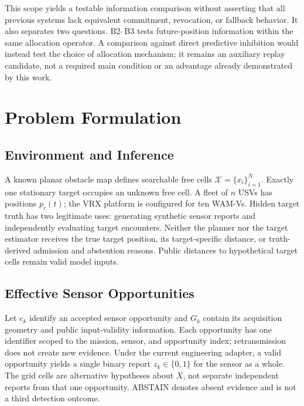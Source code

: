 \documentclass[conference]{IEEEtran}
\begin{document}
This scope yields a testable information comparison without asserting that all previous systems lack equivalent commitment, revocation, or fallback behavior. It also separates two questions. B2--B3 tests future-position information within the same allocation operator. A comparison against direct predictive inhibition would instead test the choice of allocation mechanism; it remains an auxiliary replay candidate, not a required main condition or an advantage already demonstrated by this work.

\section{Problem Formulation}
\subsection{Environment and Inference}
A known planar obstacle map defines searchable free cells $\mathcal X=\{x_i\}_{i=1}^N$. Exactly one stationary target occupies an unknown free cell. A fleet of $n$ USVs has positions $p_r(t)$; the VRX platform is configured for ten WAM-Vs. Hidden target truth has two legitimate uses: generating synthetic sensor reports and independently evaluating target encounters. Neither the planner nor the target estimator receives the true target position, its target-specific distance, or truth-derived admission and abstention reasons. Public distances to hypothetical target cells remain valid model inputs.

\subsection{Effective Sensor Opportunities}
Let $e_k$ identify an accepted sensor opportunity and $G_k$ contain its acquisition geometry and public input-validity information. Each opportunity has one identifier scoped to the mission, sensor, and opportunity index; retransmission does not create new evidence. Under the current engineering adapter, a valid opportunity yields a single binary report $z_k\in\{0,1\}$ for the sensor as a whole. The grid cells are alternative hypotheses about $X$, not separate independent reports from that one opportunity. ABSTAIN denotes absent evidence and is not a third detection outcome.
\end{document}
